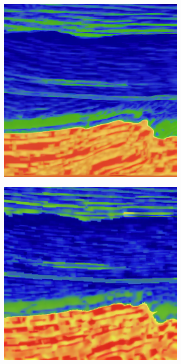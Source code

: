 \documentclass{IMAGE2025}
\begin{document}
\begin{figure}
{\begin{figure}[H]
{}


\end{figure}%

\begin{figure}[H]

{\centering \includegraphics[width=1\textwidth,height=\textheight]{./figs/gen8W.png}

}


\end{figure}%

\begin{figure}[H]

{\centering \includegraphics[width=1\textwidth,height=\textheight]{./figs/imagegen4WSGM.png}

}
\end{figure}}
\end{figure}
\end{document}
